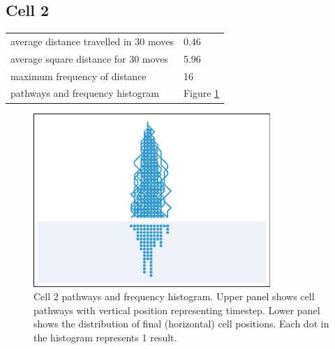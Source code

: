 \documentclass[11pt,a4paper]{article}
\newcommand \bt{\begin{longtable}{p{0.65\textwidth}p{0.25\textwidth}}}
\newcommand \et{\end{longtable}}
\begin{document}
\subsection*{Cell 2}
\bt
average distance travelled in 30 moves &  0.46\\
average square distance for 30 moves & 5.96\\
maximum frequency of distance & 16\\
pathways and frequency histogram & Figure \ref{fig2}
\et
\begin{figure}[htbp]
\begin{center}
\includegraphics[width=0.8\textwidth]{CA30_R40L40_2.eps}
\caption{Cell 2 pathways and frequency histogram. Upper panel shows cell pathways with vertical position representing timestep. 
Lower panel shows the distribution of final (horizontal) cell positions. Each dot in the histogram represents 1 result.}
\label{fig2}
\end{center}
\end{figure}
\end{document}
